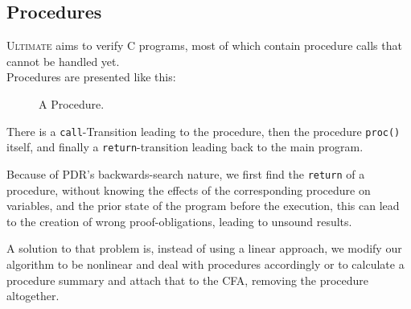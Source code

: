 \documentclass[11pt, a4paper, BCOR=10mm, ngerman]{scrbook}
\begin{document}
\subsection{Procedures}
\textsc{Ultimate} aims to verify C programs, most of which contain procedure calls that cannot be handled yet. \\ Procedures are presented like this: 

\begin{figure}[H]
\centering
{}
  \caption{A Procedure.}
 \end{figure}
 \label{procedure Ex}  

There is a \texttt{call}-Transition leading to the procedure, then the procedure \texttt{proc()} itself, and finally a \texttt{return}-transition leading back to the main program. \par
Because of PDR's backwards-search nature, we first find the \texttt{return} of a procedure, without knowing the effects of the corresponding procedure on variables, and the prior state of the program before the execution, this can lead to the creation of wrong proof-obligations, leading to unsound results. \par

A solution to that problem is, instead of using a linear approach, we modify our algorithm to be nonlinear and deal with procedures accordingly \cite{DBLP:conf/sat/HoderB12} or to calculate a procedure summary and attach that to the CFA, removing the procedure altogether.
%

%
%
\end{document}
